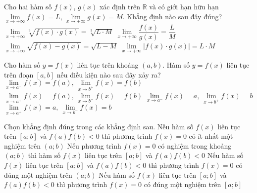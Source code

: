 \begin{ex}%
	Cho hai hàm số $f(x)$, $g(x)$ xác định trên $\mathbb{R}$ và có giới hạn  hữu hạn $\lim\limits_{x\to +\infty}f(x)=L$, $\lim\limits_{x\to+\infty}g(x)=M$. Khẳng định nào sau đây đúng?
	\choice
	{\True $\lim\limits_{x\to +\infty}\sqrt[3]{f(x)\cdot g(x)}=\sqrt[3]{L\cdot M}$}
	{$\lim\limits_{x\to +\infty}\dfrac{f(x)}{g(x)}=\dfrac{L}{M}$}
	{$\lim\limits_{x\to+\infty}\sqrt{f(x)-g(x)}=\sqrt{L-M}$}
	{$\lim\limits_{x\to +\infty}|f(x)\cdot g(x)|=L\cdot M$}
	
\end{ex}
\begin{ex}%
	Cho hàm số $y=f(x)$ liên tục trên khoảng $(a,b)$. Hàm số $y=f(x)$ liên tục trên đoạn $[a,b]$ nếu điều kiện nào sau đây xảy ra?
	\choice
	{$\lim\limits_{x \to {a^ - }} f(x) = f(a),\ \lim\limits_{x \to {b^ + }} f(x) = f(b)$}
	{\True $\lim\limits_{x \to {a^ + }} f(x) = f(a),\ \lim\limits_{x \to {b^ - }} f(x) = f(b)$}
	{$\lim\limits_{x \to {a^ - }} f(x) = a,\ \lim\limits_{x \to {b^ + }} f(x) = b$}
	{$\lim\limits_{x \to {a^ + }} f(x) = a,\ \lim\limits_{x \to {b^ - }} f(x) = b$}
\end{ex}



\begin{ex}%
	Chọn khẳng định đúng trong các khẳng định sau.
	\choice
	{\True Nếu hàm số $f(x)$ liên tục trên $[a;b]$ và $f(a)f(b)<0$ thì phương trình $f(x)=0$ có ít nhất một nghiệm trên $(a;b)$}
	{Nếu phương trình $f(x)=0$ có nghiệm trong khoảng $(a;b)$ thì hàm số $f(x)$ liên tục trên $[a;b]$ và $f(a)f(b)<0$}
	{Nếu hàm số $f(x)$ liên tục trên $[a;b]$ và $f(a)f(b)<0$ thì phương trình $f(x)=0$ có đúng một nghiệm trên $(a;b)$}
	{Nếu hàm số $f(x)$ liên tục trên $[a;b]$ và $f(a)f(b)<0$ thì phương trình $f(x)=0$ có đúng một nghiệm trên $[a;b]$}
\end{ex}


